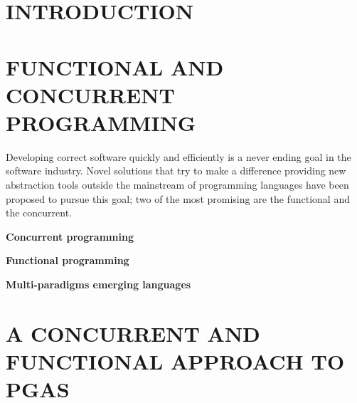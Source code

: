 \documentclass[a4paper,10pt,twoside, top=3.3cm,
bottom=4.2cm, left=2.6cm, right=2.6cm]{article}
\newcommand{\simpleEntry}[1]{
\vspace{.3cm}
\noindent \textbf{#1}
\vspace{.3cm}
}
\begin{document}
\onecolumn \maketitle \normalsize \vfill

\section{\uppercase{Introduction}}
\label{sec:intro}
    

\section{\uppercase{Functional and concurrent programming}}
\label{sec:stateArt}
\noindent Developing correct software quickly and efficiently is a never ending goal in the software industry. Novel solutions that try to make a difference providing new abstraction tools outside the mainstream of programming languages have been proposed to pursue this goal; two of the most promising are the functional and the concurrent.





\simpleEntry{Concurrent programming}
    

\simpleEntry{Functional programming}
    

\simpleEntry{Multi-paradigms emerging languages} %
    

\section{\uppercase{A concurrent and functional approach to pGAs}}
\label{sec:design}
    
\end{document}
